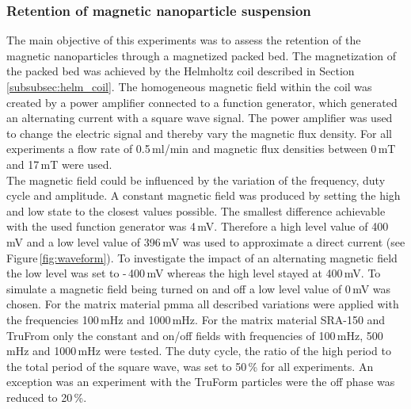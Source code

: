 \subsubsection{Retention of magnetic nanoparticle suspension}
\label{subsubsec:Ret_nanopart_method}
The main objective of this experiments was to assess the retention of the magnetic nanoparticles through a magnetized packed bed. The magnetization of the packed bed was achieved by the Helmholtz coil described in Section\,\ref{subsubsec:helm_coil}. The homogeneous magnetic field within the coil was created by a power amplifier connected to a function generator, which generated an alternating current with a square wave signal. The power amplifier was used to change the electric signal and thereby vary the magnetic flux density. For all experiments a flow rate of 0.5\,ml/min and magnetic flux densities between 0\,mT and 17\,mT were used. \\
The magnetic field could be influenced by the variation of the frequency, duty cycle and amplitude. A constant magnetic field was produced by setting the high and low state to the closest values possible. The smallest difference achievable with the used function generator was 4\,mV. Therefore a high level value of 400\,mV and a low level value of 396\,mV was used to approximate a direct current (see Figure\,\ref{fig:waveform}). To investigate the impact of an alternating magnetic field the low level was set to -\,400\,mV whereas the high level stayed at 400\,mV. To simulate a magnetic field being turned on and off a low level value of 0\,mV was chosen. For the matrix material \gls{pmma} all described variations were applied with the frequencies 100\,mHz and 1000\,mHz. For the matrix material SRA-150 and TruFrom only the constant and on/off fields with frequencies of 100\,mHz, 500\,mHz and 1000\,mHz were tested. The duty cycle, the ratio of the high period to the total period of the square wave, was set to 50\,\% for all experiments. An exception was an experiment with the TruForm particles were the off phase was reduced to 20\,\%.

